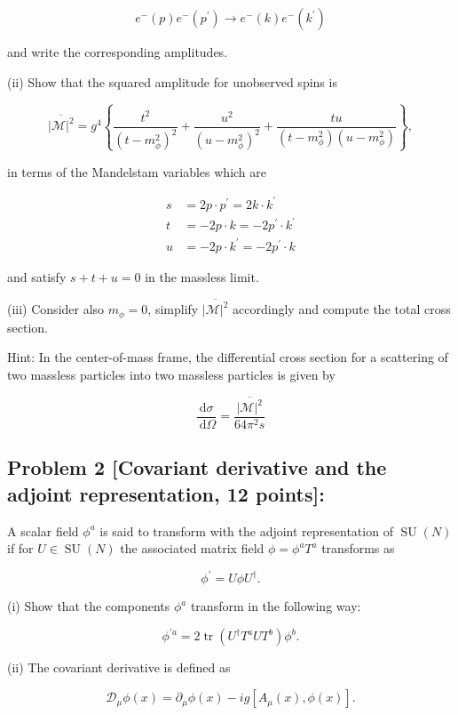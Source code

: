 \documentclass[10pt, letterpaper]{article}
\begin{document}
$$
e^{-}(p) e^{-}\left(p^{\prime}\right) \longrightarrow e^{-}(k) e^{-}\left(k^{\prime}\right)
$$

and write the corresponding amplitudes.


(ii) Show that the squared amplitude for unobserved spins is

$$
\overline{|\mathcal{M}|^2}=g^4\left\{\frac{t^2}{\left(t-m_\phi^2\right)^2}+\frac{u^2}{\left(u-m_\phi^2\right)^2}+\frac{t u}{\left(t-m_\phi^2\right)\left(u-m_\phi^2\right)}\right\},
$$

in terms of the Mandelstam variables which are

$$
\begin{aligned}
s & =2 p \cdot p^{\prime}=2 k \cdot k^{\prime} \\
t & =-2 p \cdot k=-2 p^{\prime} \cdot k^{\prime} \\
u & =-2 p \cdot k^{\prime}=-2 p^{\prime} \cdot k
\end{aligned}
$$

and satisfy $s+t+u=0$ in the massless limit.


(iii) Consider also $m_\phi=0$, simplify $\overline{|\mathcal{M}|^2}$ accordingly and compute the total cross section.

Hint: In the center-of-mass frame, the differential cross section for a scattering of two massless particles into two massless particles is given by

$$
\frac{\mathrm{d} \sigma}{\mathrm{~d} \Omega}=\frac{\overline{|\mathcal{M}|^2}}{64 \pi^2 s}
$$




\subsection{Problem 2 [Covariant derivative and the adjoint representation, 12 points]: }

A scalar field $\phi^a$ is said to transform with the adjoint representation of $\operatorname{SU}(N)$ if for $U \in \operatorname{SU}(N)$ the associated matrix field $\phi=\phi^a T^a$ transforms as

$$
\phi^{\prime}=U \phi U^{\dagger} .
$$

(i) Show that the components $\phi^a$ transform in the following way:

$$
\phi^{\prime a}=2 \operatorname{tr}\left(U^{\dagger} T^a U T^b\right) \phi^b .
$$

(ii) The covariant derivative is defined as

$$
\mathcal{D}_\mu \phi(x)=\partial_\mu \phi(x)-i g\left[A_\mu(x), \phi(x)\right] .
$$
\end{document}
